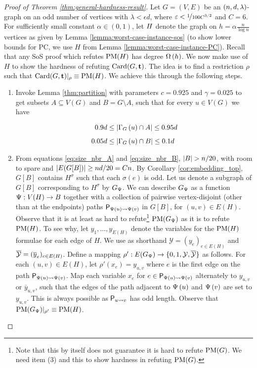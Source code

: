 \documentclass[11pt]{article}
\begin{document}
\begin{proof}[Proof of Theorem \ref{thm:general-hardness-result}]
Let $G=(V,E)$ be an $\EnDeeLambda$-graph on an odd number of vertices with $\lambda < \epsilon d$, where $\epsilon < \nicefrac{1}{100C^{3/2}}$ and $C=6$. 
For sufficiently small constant $\alpha \in (0,1)$, let $\HardInstance$ denote the graph on $h=\alpha\frac{n}{\log n}$ vertices as given by Lemma \ref{lemma:worst-case-instance-sos} (to show lower bounds for PC, we use $H$ from Lemma \ref{lemma:worst-case-instance-PC}). Recall that any SoS proof which refutes $\PM{H}$ has degree $\BigOmega{h}$. We now make use of $H$ to show the hardness of refuting $\Card{G, \vec{t}}$. The idea is to find a restriction $\rho$ such that $\Card{G, \vec{t}}|_\rho \equiv \PM{H}$. We achieve this through the following steps.

\begin{enumerate}
\item{Invoke Lemma  \ref{thm:partition} with parameters $c=0.925$ and $\gamma = 0.025$ to get subsets $A \subseteq V(G)$ and $B = G \setminus A$, such that for every $u \in V(G)$ we have
    
\begin{align} 
0.9d  &\leq   \Size{\Neighbourhood{G}{u} \cap \RedA} \leq 0.95d \label{eq:size_nbr_A}\\[5pt]
0.05d  &\leq   \Size{\Neighbourhood{G}{u} \cap \GreenB} \leq 0.1d 
\label{eq:size_nbr_B}
\end{align}
}

\item{From equations \eqref{eq:size_nbr_A} and \eqref{eq:size_nbr_B}, $\Size{B} > n/20$, with room to spare and $\Size{E(G[B])} \ge nd/20 = Cn$.
    By Corollary \ref{cor:embedding_top}, $G[B]$ contains $H^{\sigma}$ such that each $\sigma(e)$ is odd. Let us denote a subgraph of $G[B]$ corresponding to $H^{\sigma}$ by $G_{\EmbeddingFunc}$.
    We can describe $G_\EmbeddingFunc$ as a function $\EmbeddingFunc: V(H) \to B$ together with a collection of pairwise vertex-disjoint (other than at the endpoints) paths  $\Path{\Embedding{u}}{\Embedding{v}}$ in $G[B]$, for $(u,v) \in E(H)$.
    Observe that it is at least as hard to refute\footnote{Note that this by itself does not guarantee it is hard to refute $\PM{G}$. We need item (3) and this to show hardness in refuting $\PM{G}$.} $\PM{G_{\EmbeddingFunc}}$ as it is to refute $\PM{H}$.
To see why, let $y_1, \dots, y_{E(H)}$ denote the variables for the $\PM{H}$ formulae for each edge of $H$.
We use as shorthand $\mathcal{Y} = (y_e)_{e \in E(H)}$ and $\Complement{\mathcal{Y}} = (\Complement{y}_e)_{e \in E(H)}$.
Define a mapping $\rho': \Edges{G_\EmbeddingFunc} \to \{0,1, \mathcal{Y}, \Complement{\mathcal{Y}} \}$ as follows. For each $(u,v) \in E(H)$, let $\rho'(x_e) = y_{u,v}$ where $e$ is the first edge on the path $\Path{\Embedding{u}}{\Embedding{v}}$.
Map each variable $x_e$ for $e \in \Path{\Embedding{u}}{\Embedding{v}}$ alternately to $y_{u,v}$ or $\bar{y}_{u,v}$, such that the edges of the path adjacent to $\Embedding{u}$ and $\Embedding{v}$ are set to $y_{u,v}$. This is always possible as $\Path{u}{v}$ has odd length. Observe that $\PM{G_\EmbeddingFunc}|_{\rho'} \equiv \PM{H}$. 
  }


\end{enumerate}
\end{proof}
\end{document}
